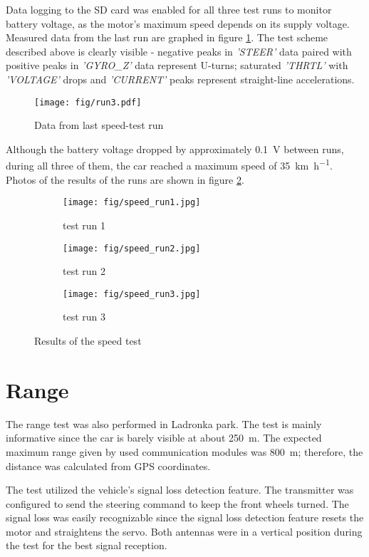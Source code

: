 Data logging to the SD card was enabled for all three test runs to monitor battery voltage, as the motor's maximum speed depends on its supply voltage. Measured data from the last run are graphed in figure \ref{fig:sd_speed}. The test scheme described above is clearly visible - negative peaks in \textit{'STEER'} data paired with positive peaks in \textit{'GYRO\_Z'} data represent U-turns; saturated \textit{'THRTL'} with \textit{'VOLTAGE'} drops and \textit{'CURRENT'} peaks represent straight-line accelerations.
\begin{figure}[h]
\centering
\texttt{[image: fig/run3.pdf]}
\caption{Data from last speed-test run}
\label{fig:sd_speed}
\end{figure}

Although the battery voltage dropped by approximately \SI{0.1}{\V} between runs, during all three of them, the car reached a maximum speed of \SI{35}{\km\per\hour}. Photos of the results of the runs are shown in figure \ref{fig:speed}.
\begin{figure}[h]
    \centering
    \begin{subfigure}{0.3\textwidth}
    \centering
        \texttt{[image: fig/speed\_run1.jpg]}
		\caption{test run 1}
    \end{subfigure}%
    \hspace{0.2cm}
    \begin{subfigure}{0.3\textwidth}
    \centering
		\texttt{[image: fig/speed\_run2.jpg]}
		\caption{test run 2}
    \end{subfigure}
    \hspace{0.2cm}
    \begin{subfigure}{0.3\textwidth}
    \centering
		\texttt{[image: fig/speed\_run3.jpg]}
		\caption{test run 3}
    \end{subfigure}
	\caption{Results of the speed test}
    \label{fig:speed}
\end{figure}

\section{Range}
The range test was also performed in Ladronka park. The test is mainly informative since the car is barely visible at about \SI{250}{\m}. The expected maximum range given by used communication modules was \SI{800}{\m}; therefore, the distance was calculated from GPS coordinates.

The test utilized the vehicle's signal loss detection feature. The transmitter was configured to send the steering command to keep the front wheels turned. The signal loss was easily recognizable since the signal loss detection feature resets the motor and straightens the servo. Both antennas were in a vertical position during the test for the best signal reception.

